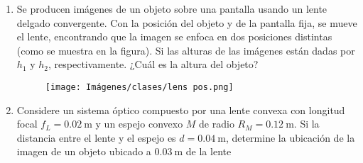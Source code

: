 \documentclass[letterpaper,11pt]{article}
\begin{document}
\begin{enumerate}

\item 
\begin{multicols}{2}
    Se producen imágenes de un objeto sobre una pantalla usando un lente delgado convergente. Con la posición del objeto y de la pantalla fija, se mueve el lente, encontrando que la imagen se enfoca en dos posiciones distintas (como se muestra en la figura). Si las alturas de las imágenes están dadas por $h_1$ y $h_2$, respectivamente. ¿Cuál es la altura del objeto?

    \columnbreak
    
    \begin{figure}[H]
        \centering
        \texttt{[image: Imágenes/clases/lens pos.png]}
    \end{figure}
\end{multicols}

\item 
\begin{multicols}{2}
    Considere un sistema óptico compuesto por una lente convexa con longitud focal $f_L=\SI{0.02}{\m}$ y un espejo convexo $M$ de radio $R_M=\SI{0.12}{\m}$. Si la distancia entre el lente y el espejo es $d=\SI{0.04}{\m}$, determine la ubicación de la imagen de un objeto ubicado a $\SI{0.03}{\m}$ de la lente


\end{multicols}
\end{enumerate}
\end{document}
